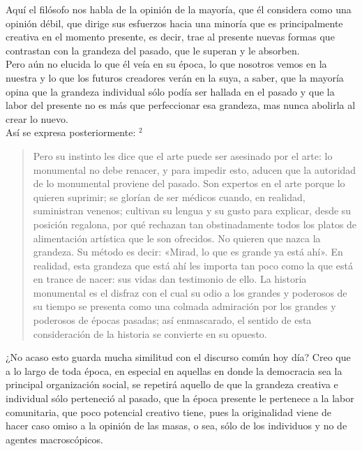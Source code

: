 \documentclass{article}
\begin{document}
\begin{itemize}
Aquí el filósofo nos habla de la opinión de la mayoría, que él considera como una opinión débil, que dirige sus esfuerzos hacia una minoría que es principalmente creativa en el momento presente, es decir, trae al presente nuevas formas que contrastan con la grandeza del pasado, que le superan y le absorben.\\
Pero aún no elucida lo que él veía en su época, lo que nosotros vemos en la nuestra y lo que los futuros creadores verán en la suya, a saber, que la mayoría opina que la grandeza individual sólo podía ser hallada en el pasado y que la labor del presente no es más que perfeccionar esa grandeza, mas nunca abolirla al crear lo nuevo.\\
Así se expresa posteriormente: $^2$ \\

\begin{quote}
    Pero su instinto les dice que el arte puede ser asesinado por el arte: lo monumental no debe renacer, y para impedir esto, aducen que la autoridad de lo monumental proviene del pasado. Son expertos en el arte porque lo quieren suprimir; se glorían de ser médicos cuando, en realidad, suministran venenos; cultivan su lengua y su gusto para explicar, desde su posición regalona, por qué rechazan tan obstinadamente todos los platos de alimentación artística que le son ofrecidos. No quieren que nazca la grandeza. Su método es decir: «Mirad, lo que es grande ya está ahí». En realidad, esta grandeza que está ahí les importa tan poco como la que está en trance de nacer: sus vidas dan testimonio de ello. La historia monumental es el disfraz con el cual su odio a los grandes y poderosos de su tiempo se presenta como una colmada admiración por los grandes y poderosos de épocas pasadas; así enmascarado, el sentido de esta consideración de la historia se convierte en su opuesto.
\end{quote}

¿No acaso esto guarda mucha similitud con el discurso común hoy día? Creo que a lo largo de toda época, en especial en aquellas en donde la democracia sea la principal organización social, se repetirá aquello de que la grandeza creativa e individual sólo perteneció al pasado, que la época presente le pertenece a la labor comunitaria, que poco potencial creativo tiene, pues la originalidad viene de hacer caso omiso a la opinión de las masas, o sea, sólo de los individuos y no de agentes macroscópicos.
    
\end{itemize}
\end{document}
